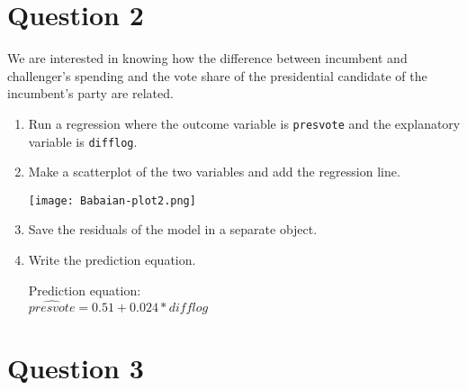 \documentclass[12pt,letterpaper]{article}
\begin{document}
\section*{Question 2}
\noindent We are interested in knowing how the difference between incumbent and challenger's spending and the vote share of the presidential candidate of the incumbent's party are related.	\vspace{.25cm}
	\begin{enumerate}
		\item Run a regression where the outcome variable is \texttt{presvote} and the explanatory variable is \texttt{difflog}.	\vspace{.2cm}
			  
		\item Make a scatterplot of the two variables and add the regression line. 	
		\vspace{.2cm}
		  
\vspace{.2cm}
\begin{center}
	\texttt{[image: Babaian-plot2.png]}
	\end{center}
\vspace{.2cm}
		\item Save the residuals of the model in a separate object.	\vspace{.1cm}
		\vspace{.2cm}
		  
		\item Write the prediction equation.
			  
		
		Prediction equation: \\
		$\widehat{\textit{presvote}} = 0.51 + 0.024*\textit{difflog}$
	\end{enumerate}
	
	\newpage	
\section*{Question 3}
\end{document}
